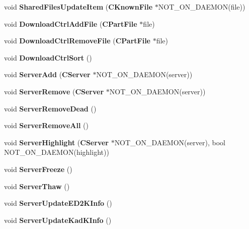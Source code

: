 \begin{DoxyCompactItemize}
\item 
void {\bfseries SharedFilesUpdateItem} ({\bf CKnownFile} $\ast$NOT\_\-ON\_\-DAEMON(file))\label{namespaceMuleNotify_ad51f1c824f1852e11f8cc76882f62410}

\item 
void {\bfseries DownloadCtrlAddFile} ({\bf CPartFile} $\ast$file)\label{namespaceMuleNotify_ac4dc2f4588f7f131ddb4e16976829571}

\item 
void {\bfseries DownloadCtrlRemoveFile} ({\bf CPartFile} $\ast$file)\label{namespaceMuleNotify_ae291463f88ef680a8607eafb99065bb1}

\item 
void {\bfseries DownloadCtrlSort} ()\label{namespaceMuleNotify_a284c0dc307c43343a74f442f8a3e31d5}

\item 
void {\bfseries ServerAdd} ({\bf CServer} $\ast$NOT\_\-ON\_\-DAEMON(server))\label{namespaceMuleNotify_a566e5717d60146a93d91b111d679dda3}

\item 
void {\bfseries ServerRemove} ({\bf CServer} $\ast$NOT\_\-ON\_\-DAEMON(server))\label{namespaceMuleNotify_a0cc69a69ea7c530d3c7a8f59b49dfa45}

\item 
void {\bfseries ServerRemoveDead} ()\label{namespaceMuleNotify_a08b168583b0186ed1e69851874e747a5}

\item 
void {\bfseries ServerRemoveAll} ()\label{namespaceMuleNotify_a183563a6abdb150dc52ddc618e562117}

\item 
void {\bfseries ServerHighlight} ({\bf CServer} $\ast$NOT\_\-ON\_\-DAEMON(server), bool NOT\_\-ON\_\-DAEMON(highlight))\label{namespaceMuleNotify_a302fb55b47251f278d8829888708fd43}

\item 
void {\bfseries ServerFreeze} ()\label{namespaceMuleNotify_a3050969d5bcc1ff11c5273310ef36452}

\item 
void {\bfseries ServerThaw} ()\label{namespaceMuleNotify_a1febd2e6e05b77e655c575956110282f}

\item 
void {\bfseries ServerUpdateED2KInfo} ()\label{namespaceMuleNotify_aa5c3f21ac4ee49d5af61fc037a46c902}

\item 
void {\bfseries ServerUpdateKadKInfo} ()\label{namespaceMuleNotify_a898796816a50a0561edb00743512704d}


\end{DoxyCompactItemize}
